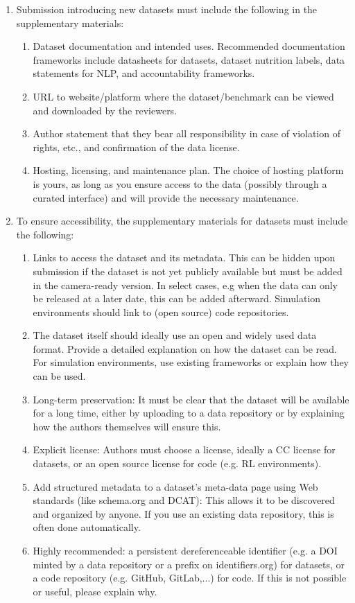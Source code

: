 \documentclass{article}
\begin{document}
\begin{enumerate}

\item Submission introducing new datasets must include the following in the supplementary materials:
\begin{enumerate}
  \item Dataset documentation and intended uses. Recommended documentation frameworks include datasheets for datasets, dataset nutrition labels, data statements for NLP, and accountability frameworks.
  \item URL to website/platform where the dataset/benchmark can be viewed and downloaded by the reviewers.
  \item Author statement that they bear all responsibility in case of violation of rights, etc., and confirmation of the data license.
  \item Hosting, licensing, and maintenance plan. The choice of hosting platform is yours, as long as you ensure access to the data (possibly through a curated interface) and will provide the necessary maintenance.
\end{enumerate}

\item To ensure accessibility, the supplementary materials for datasets must include the following:
\begin{enumerate}
  \item Links to access the dataset and its metadata. This can be hidden upon submission if the dataset is not yet publicly available but must be added in the camera-ready version. In select cases, e.g when the data can only be released at a later date, this can be added afterward. Simulation environments should link to (open source) code repositories.
  \item The dataset itself should ideally use an open and widely used data format. Provide a detailed explanation on how the dataset can be read. For simulation environments, use existing frameworks or explain how they can be used.
  \item Long-term preservation: It must be clear that the dataset will be available for a long time, either by uploading to a data repository or by explaining how the authors themselves will ensure this.
  \item Explicit license: Authors must choose a license, ideally a CC license for datasets, or an open source license for code (e.g. RL environments).
  \item Add structured metadata to a dataset's meta-data page using Web standards (like schema.org and DCAT): This allows it to be discovered and organized by anyone. If you use an existing data repository, this is often done automatically.
  \item Highly recommended: a persistent dereferenceable identifier (e.g. a DOI minted by a data repository or a prefix on identifiers.org) for datasets, or a code repository (e.g. GitHub, GitLab,...) for code. If this is not possible or useful, please explain why.
\end{enumerate}


\end{enumerate}
\end{document}
